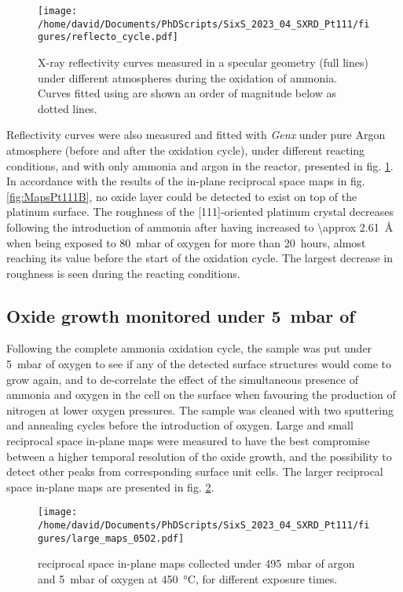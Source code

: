 \begin{figure}[!htb]
    \centering
    \texttt{[image: /home/david/Documents/PhDScripts/SixS\_2023\_04\_SXRD\_Pt111/figures/reflecto\_cycle.pdf]}
    \caption{
    	X-ray reflectivity curves measured in a specular geometry (full lines) under different atmospheres during the oxidation of ammonia.
    	Curves fitted using  are shown an order of magnitude below as dotted lines.
    }
    \label{fig:ReflectoCycle}
\end{figure}

Reflectivity curves were also measured and fitted with \textit{Genx} under pure Argon atmosphere (before and after the oxidation cycle), under different reacting conditions, and with only ammonia and argon in the reactor, presented in fig. \ref{fig:ReflectoCycle}.
In accordance with the results of the in-plane reciprocal space maps in fig. \ref{fig:MapsPt111B}, no oxide layer could be detected to exist on top of the platinum surface.
The roughness of the [111]-oriented platinum crystal decreases following the introduction of ammonia after having increased to \qty{\approx 2.61}{\angstrom} when being exposed to \qty{80}{\milli\bar} of oxygen for more than \qty{20}{hours}, almost reaching its value before the start of the oxidation cycle.
The largest decrease in roughness is seen during the reacting conditions.

\subsection{Oxide growth monitored under \qty{5}{\milli\bar} of }

Following the complete ammonia oxidation cycle, the sample was put under \qty{5}{\milli\bar} of oxygen to see if any of the detected surface structures would come to grow again, and to de-correlate the effect of the simultaneous presence of ammonia and oxygen in the cell on the surface when favouring the production of nitrogen at lower oxygen pressures.
The sample was cleaned with two sputtering and annealing cycles before the introduction of oxygen.
Large and small reciprocal space in-plane maps were measured to have the best compromise between a higher temporal resolution of the oxide growth, and the possibility to detect other peaks from corresponding surface unit cells.
The larger reciprocal space in-plane maps are presented in fig. \ref{fig:LargeMapsPt111LowOxygen}.

\begin{figure}[!htb]
    \centering
    \texttt{[image: /home/david/Documents/PhDScripts/SixS\_2023\_04\_SXRD\_Pt111/figures/large\_maps\_05O2.pdf]}
    \caption{
        reciprocal space in-plane maps collected under \qty{495}{\milli\bar} of argon and \qty{5}{\milli\bar} of oxygen at \qty{450}{\degreeCelsius}, for different exposure times.
    }
    \label{fig:LargeMapsPt111LowOxygen}
\end{figure}

